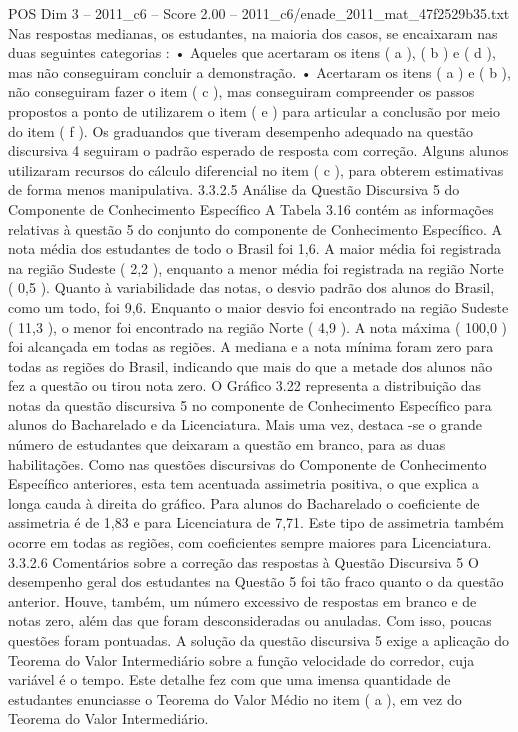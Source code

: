 \begin{textsample}{POS Dim 3 – 2011\_c6 – Score 2.00 – 2011\_c6/enade\_2011\_mat\_47f2529b35.txt}
Nas respostas medianas, os estudantes, na maioria dos casos, se encaixaram nas duas seguintes categorias : • Aqueles que acertaram os itens ( a ), ( b ) e ( d ), mas não conseguiram concluir a demonstração. • Acertaram os itens ( a ) e ( b ), não conseguiram fazer o item ( c ), mas conseguiram compreender os passos propostos a ponto de utilizarem o item ( e ) para articular a conclusão por meio do item ( f ).
Os graduandos que tiveram desempenho adequado na questão discursiva 4 seguiram o padrão esperado de resposta com correção.
Alguns alunos utilizaram recursos do cálculo diferencial no item ( c ), para obterem estimativas de forma menos manipulativa. 3.3.2.5 Análise da Questão Discursiva 5 do Componente de Conhecimento Específico A Tabela 3.16 contém as informações relativas à questão 5 do conjunto do componente de Conhecimento Específico.
A nota média dos estudantes de todo o Brasil foi 1,6.
A maior média foi registrada na região Sudeste ( 2,2 ), enquanto a menor média foi registrada na região Norte ( 0,5 ).
Quanto à variabilidade das notas, o desvio padrão dos alunos do Brasil, como um todo, foi 9,6.
Enquanto o maior desvio foi encontrado na região Sudeste ( 11,3 ), o menor foi encontrado na região Norte ( 4,9 ).
A nota máxima ( 100,0 ) foi alcançada em todas as regiões.
A mediana e a nota mínima foram zero para todas as regiões do Brasil, indicando que mais do que a metade dos alunos não fez a questão ou tirou nota zero.
O Gráfico 3.22 representa a distribuição das notas da questão discursiva 5 no componente de Conhecimento Específico para alunos do Bacharelado e da Licenciatura.
Mais uma vez, destaca -se o grande número de estudantes que deixaram a questão em branco, para as duas habilitações.
Como nas questões discursivas do Componente de Conhecimento Específico anteriores, esta tem acentuada assimetria positiva, o que explica a longa cauda à direita do gráfico.
Para alunos do Bacharelado o coeficiente de assimetria é de 1,83 e para Licenciatura de 7,71.
Este tipo de assimetria também ocorre em todas as regiões, com coeficientes sempre maiores para Licenciatura. 3.3.2.6 Comentários sobre a correção das respostas à Questão Discursiva 5 O desempenho geral dos estudantes na Questão 5 foi tão fraco quanto o da questão anterior.
Houve, também, um número excessivo de respostas em branco e de notas zero, além das que foram desconsideradas ou anuladas.
Com isso, poucas questões foram pontuadas.
A solução da questão discursiva 5 exige a aplicação do Teorema do Valor Intermediário sobre a função velocidade do corredor, cuja variável é o tempo.
Este detalhe fez com que uma imensa quantidade de estudantes enunciasse o Teorema do Valor Médio no item ( a ), em vez do Teorema do Valor Intermediário.

\end{textsample}
